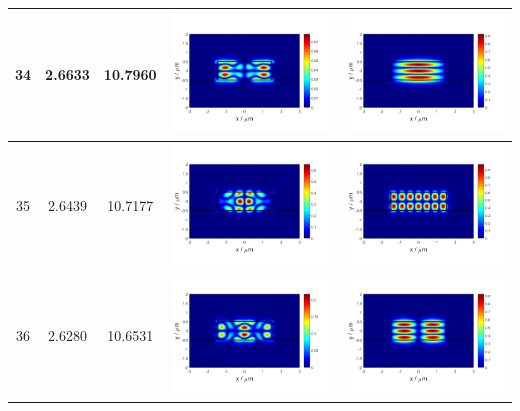 \documentclass{assignment}
\begin{document}
\begin{sol}
\begin{itemize}
\begin{longtable}[c]{|c|c|c|c|c|}
            34 & 2.6633 & 10.7960 & \includegraphics[width=.3\columnwidth]{Assignment-2-mode-34-Ex.png} & \includegraphics[width=.3\columnwidth]{Assignment-2-mode-34-Ey.png} \\ \hline
            35 & 2.6439 & 10.7177 & \includegraphics[width=.3\columnwidth]{Assignment-2-mode-35-Ex.png} & \includegraphics[width=.3\columnwidth]{Assignment-2-mode-35-Ey.png} \\ \hline
            36 & 2.6280 & 10.6531 & \includegraphics[width=.3\columnwidth]{Assignment-2-mode-36-Ex.png} & \includegraphics[width=.3\columnwidth]{Assignment-2-mode-36-Ey.png} \\ \hline

\end{longtable}
\end{itemize}
\end{sol}
\end{document}

